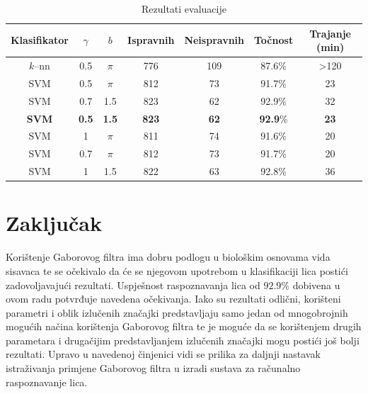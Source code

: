 \documentclass{ru}
\begin{document}
\begin{table}[ht]
\caption{Rezultati evaluacije}
\centering
\begin{tabular}{c c c c c c c}
\hline\hline
Klasifikator & $\gamma$ & $b$ & Ispravnih & Neispravnih &
Točnost & Trajanje (min) \\ [0.5ex]
\hline
$k$--nn & 0.5 & $\pi$ & 776 & 109 & 87.6\% & >120 \\
SVM & 0.5 & $\pi$ & 812  & 73 & 91.7\% & 23 \\
SVM & 0.7 & 1.5 & 823  & 62 & 92.9\% & 32\\
\textbf{SVM} & \textbf{0.5} & \textbf{1.5} & \textbf{823}  & \textbf{62} & \textbf{92.9}\% & \textbf{23}\\
SVM & 1 & $\pi$ & 811  & 74 & 91.6\% & 20\\
SVM & 0.7 & $\pi$ & 812  & 73 & 91.7\% & 20\\
SVM & 1 & 1.5 & 822  & 63 & 92.8\% & 36\\ [1ex]
\hline
\end{tabular}
\label{tbl:eval}
\end{table}

\chapter{Zaključak}

Korištenje Gaborovog filtra ima dobru podlogu u biološkim osnovama vida
sisavaca te se očekivalo da će se njegovom upotrebom u klasifikaciji lica
postići zadovoljavajući rezultati. Uspješnost raspoznavanja lica od $92.9\%$
dobivena u ovom radu potvrđuje navedena očekivanja. Iako su rezultati
odlični, korišteni parametri i oblik izlučenih značajki predstavljaju
samo jedan od mnogobrojnih mogućih načina korištenja Gaborovog filtra te je
moguće da se korištenjem drugih parametara i drugačijim predstavljanjem
izlučenih značajki mogu postići još bolji rezultati. Upravo u navedenoj
činjenici vidi se prilika za daljnji nastavak istraživanja primjene Gaborovog
filtra u izradi sustava za računalno raspoznavanje lica.



\end{document}
